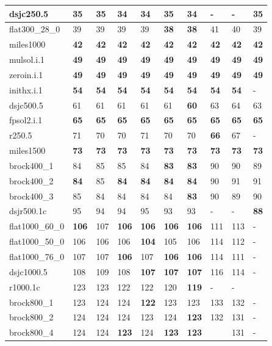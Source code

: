 \documentclass[12pt,a4paper,twoside]{scrartcl}
\numberwithin{equation}{section}
\begin{document}
\begin{table}[!htbp]
\begin{tabular}{|p{2.5cm} |p{1cm} p{1cm} p{1cm} p{1cm} p{1cm} p{1cm} p{1.8cm} p{1cm} p{1cm}|}
dsjc250.5&35&35&\textbf{34}&\textbf{34}&35&\textbf{34}&-&-&35\\ \hline
flat300\_28\_0&39&39&39&39&\textbf{38}&\textbf{38}&41&40&39\\ 
miles1000&\textbf{42}&\textbf{42}&\textbf{42}&\textbf{42}&\textbf{42}&\textbf{42}&\textbf{42}&\textbf{42}&\textbf{42}\\
mulsol.i.1&\textbf{49}&\textbf{49}&\textbf{49}&\textbf{49}&\textbf{49}&\textbf{49}&\textbf{49}&\textbf{49}&\textbf{49}\\ 
zeroin.i.1&\textbf{49}&\textbf{49}&\textbf{49}&\textbf{49}&\textbf{49}&\textbf{49}&\textbf{49}&\textbf{49}&\textbf{49}\\
inithx.i.1&\textbf{54}&\textbf{54}&\textbf{54}&\textbf{54}&\textbf{54}&\textbf{54}&\textbf{54}&\textbf{54}&-\\ \hline
dsjc500.5&61&61&61&61&61&\textbf{60}&63&64&63\\
fpsol2.i.1&\textbf{65}&\textbf{65}&\textbf{65}&\textbf{65}&\textbf{65}&\textbf{65}&\textbf{65}&\textbf{65}&\textbf{65}\\ 
r250.5&71&70&70&71&70&70&\textbf{66}&67&-\\ 
miles1500&\textbf{73}&\textbf{73}&\textbf{73}&\textbf{73}&\textbf{73}&\textbf{73}&\textbf{73}&\textbf{73}&\textbf{73}\\
brock400\_1&84&85&85&84&\textbf{83}&\textbf{83}&90&90&89\\ \hline
brock400\_2&\textbf{84}&85&\textbf{84}&\textbf{84}&\textbf{84}&\textbf{84}&90&91&91\\ 
brock400\_3&85&84&84&84&84&\textbf{83}&90&89&90\\ 
dsjr500.1c&95&94&94&95&93&93&-&-&\textbf{88}\\ 
flat1000\_60\_0&\textbf{106}&107&\textbf{106}&\textbf{106}&\textbf{106}&\textbf{106}&111&113&-\\ 
flat1000\_50\_0&106&106&106&\textbf{104}&105&106&114&112&-\\ \hline
flat1000\_76\_0&107&107&\textbf{106}&107&\textbf{106}&\textbf{106}&114&111&-\\ 
dsjc1000.5&108&109&108&\textbf{107}&\textbf{107}&\textbf{107}&116&114&-\\ 
r1000.1c&123&123&122&122&120&\textbf{119}&-&-&\\
brock800\_1&123&124&124&\textbf{122}&123&123&133&132&-\\ brock800\_2&124&124&124&123&124&\textbf{123}&132&131&-\\ \hline
brock800\_4&124&124&\textbf{123}&124&\textbf{123}&\textbf{123}&&131&-\\ 

\end{tabular}
\end{table}
\end{document}
